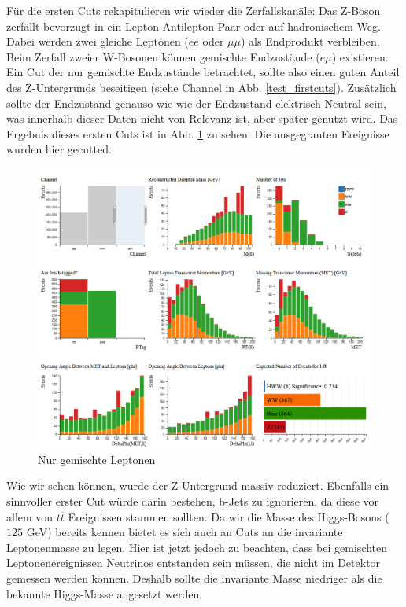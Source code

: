 Für die ersten Cuts rekapitulieren wir wieder die Zerfallskanäle:
Das Z-Boson zerfällt bevorzugt in ein Lepton-Antilepton-Paar oder auf hadronischem Weg.
Dabei werden zwei gleiche Leptonen ($ee$ oder $\mu \mu$) als Endprodukt verbleiben.
Beim Zerfall zweier W-Bosonen können gemischte Endzustände ($e \mu$) existieren.
Ein Cut der nur gemischte Endzustände betrachtet, sollte also einen guten Anteil des Z-Untergrunds beseitigen (siehe Channel in Abb. \ref{test_firstcuts}).
Zusätzlich sollte der Endzustand genauso wie wie der Endzustand elektrisch Neutral sein, was innerhalb dieser Daten nicht von Relevanz ist, aber später genutzt wird.
Das Ergebnis dieses ersten Cuts ist in Abb. \ref{mixed} zu sehen.
Die ausgegrauten Ereignisse wurden hier gecutted.

\begin{figure}[h]
\includegraphics[width=\linewidth]{../Pictures/Auswertung/mixed.png}
\caption{Nur gemischte Leptonen \cite{opendata}}
\label{mixed}
\end{figure}

\clearpage

Wie wir sehen können, wurde der Z-Untergrund massiv reduziert.
Ebenfalls ein sinnvoller erster Cut würde darin bestehen, b-Jets zu ignorieren, da diese vor allem von $t\overline{t}$ Ereignissen stammen sollten.
Da wir die Masse des Higgs-Bosons ($125$ GeV) bereits kennen bietet es sich auch an Cuts an die invariante Leptonenmasse zu legen.
Hier ist jetzt jedoch zu beachten, dass bei gemischten Leptonenereignissen Neutrinos entstanden sein müssen, die nicht im Detektor gemessen werden können.
Deshalb sollte die invariante Masse niedriger als die bekannte Higgs-Masse angesetzt werden.


